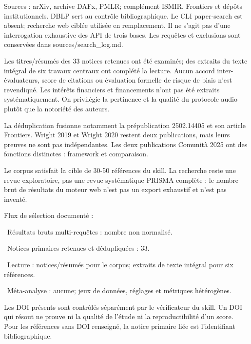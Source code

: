 \documentclass[10pt,a4paper]{article}
\begin{document}
Sources : arXiv, archive DAFx, PMLR; compl\'{e}ment ISMIR, Frontiers et d\'{e}p\^{o}ts institutionnels.
DBLP sert au contr\^{o}le bibliographique. Le CLI paper-search est absent; recherche web cibl\'{e}e
utilis\'{e}e en remplacement. Il ne s'agit pas d'une interrogation exhaustive des API de trois bases.
Les requ\^{e}tes et exclusions sont conserv\'{e}es dans sources/search\_log.md.

Les titres/r\'{e}sum\'{e}s des 33 notices retenues ont \'{e}t\'{e} examin\'{e}s; des extraits du texte int\'{e}gral de
six travaux centraux ont compl\'{e}t\'{e} la lecture. Aucun accord inter-\'{e}valuateurs, score de citations
ou \'{e}valuation formelle de risque de biais n'est revendiqu\'{e}. Les int\'{e}r\^{e}ts financiers et financements
n'ont pas \'{e}t\'{e} extraits syst\'{e}matiquement. On privil\'{e}gie la pertinence et la qualit\'{e} du protocole
audio plut\^{o}t que la notori\'{e}t\'{e} des auteurs.

La d\'{e}duplication fusionne notamment la pr\'{e}publication 2502.14405 et son article Frontiers.
Wright 2019 et Wright 2020 restent deux publications, mais leurs preuves ne sont pas ind\'{e}pendantes.
Les deux publications Comunit\`{a} 2025 ont des fonctions distinctes : framework et comparaison.

Le corpus satisfait la cible de 30-50 r\'{e}f\'{e}rences du skill. La recherche reste une revue exploratoire,
pas une revue syst\'{e}matique PRISMA compl\`{e}te : le nombre brut de r\'{e}sultats du moteur web n'est pas
un export exhaustif et n'est pas invent\'{e}.

Flux de s\'{e}lection document\'{e} :
\par\noindent\textbullet\ R\'{e}sultats bruts multi-requ\^{e}tes : nombre non normalis\'{e}.
\par\noindent\textbullet\ Notices primaires retenues et d\'{e}dupliqu\'{e}es : 33.
\par\noindent\textbullet\ Lecture : notices/r\'{e}sum\'{e}s pour le corpus; extraits de texte int\'{e}gral pour six r\'{e}f\'{e}rences.
\par\noindent\textbullet\ M\'{e}ta-analyse : aucune; jeux de donn\'{e}es, r\'{e}glages et m\'{e}triques h\'{e}t\'{e}rog\`{e}nes.

Les DOI pr\'{e}sents sont contr\^{o}l\'{e}s s\'{e}par\'{e}ment par le v\'{e}rificateur du skill. Un DOI qui r\'{e}sout ne
prouve ni la qualit\'{e} de l'\'{e}tude ni la reproductibilit\'{e} d'un score. Pour les r\'{e}f\'{e}rences sans DOI
renseign\'{e}, la notice primaire li\'{e}e est l'identifiant bibliographique.
\end{document}

